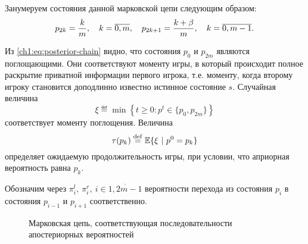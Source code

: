 {Занумеруем состояния данной марковской цепи следующим образом:
\begin{gather*}
  p_{2k} = \frac{k}{m}, \quad k = \overline{0, m}, \quad
  p_{2k+1} = \frac{k+\beta}{m}, \quad k = \overline{0, m-1}.
\end{gather*}

Из \eqref{ch1:eq:posterior-chain} видно, что состояния $p_0$ и $p_{2m}$ являются поглощающими.
Они соответствуют моменту игры, в который происходит полное раскрытие приватной информации первого игрока, т.е. моменту, когда второму игроку становится доподлинно известно истинное состояние $s$.
Случайная величина
\begin{equation*}
  \xi \eqdef \min \left\{ t \geq 0: p^t \in \{p_0, p_{2m}\} \right\}
\end{equation*}
соответствует моменту поглощения. Величина
\begin{equation*}
  \tau(p_k) \overset{\mathrm{def}}{=} \operatorname{\mathbb{E}} \{ \xi\ |\ p^0 = p_k \}
\end{equation*}
определяет ожидаемую продолжительность игры, при условии, что априорная вероятность равна $p_k$.

Обозначим через $\pi^l_i,\ \pi^r_i,\ i \in \overline{1, 2m-1}$ вероятности перехода из состояния $p_i$ в состояния $p_{i-1}$ и $p_{i+1}$ соответственно.

\begin{figure}[tb]
  \centering
  
  \caption[Последовательность апостериорных вероятностей]{Марковская цепь,
    соответствующая последовательности апостериорных вероятностей}
  \label{ch1:fig:posterior-markov}
\end{figure}

}
